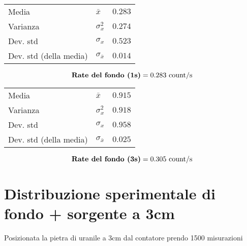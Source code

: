 \documentclass{article}
\begin{document}
\begin{minipage}[c]{0.45\textwidth}
\vspace{1cm}
\begin{center}
\hspace{0.5cm}
\begin{tabular}{llr}
	Media                       & $\bar{x}$             & $0.283$       \\		
	Varianza                    & $\sigma_{x}^2$          & $0.274$     \\
	Dev. std                    & $\sigma_{x}$              & $0.523$   \\
	Dev. std (della media)      & $\sigma_{\bar{x}}$    & $0.014$       \\
\end{tabular}
\end{center}

\[ 
	\text{\textbf{Rate del fondo (1s)}} = 0.283 \text{ count/s}
\]
\end{minipage}
\hfill
\begin{minipage}[c]{0.45\textwidth}
\vspace{1cm}
\begin{center}
\begin{tabular}{llr}
	Media                       & $\bar{x}$             & $0.915$       \\		
	Varianza                    & $\sigma_{x}^2$          & $0.918$     \\
	Dev. std                    & $\sigma_{x}$              & $0.958$   \\
	Dev. std (della media)      & $\sigma_{\bar{x}}$    & $0.025$       \\
\end{tabular}
\end{center}

\[ 
	\text{\textbf{Rate del fondo (3s)}} = 0.305 \text{ count/s}
\]
\end{minipage}




\section{Distribuzione sperimentale di fondo + sorgente a 3cm}
Posizionata la pietra di uranile a 3cm dal contatore prendo 1500 misurazioni 
\end{document}
